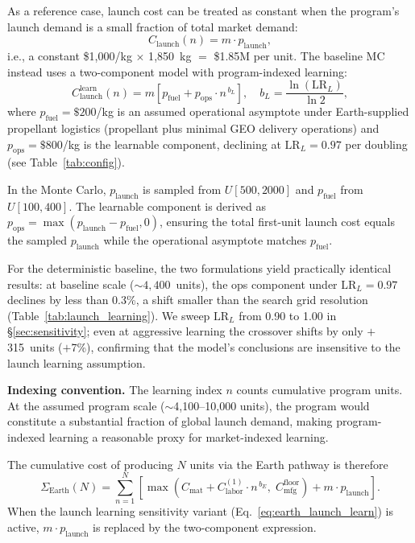 \documentclass[preprint,12pt]{elsarticle}
\begin{document}
As a reference case, launch cost can be treated as constant when the program's launch demand is a small fraction of total market demand:
\begin{equation}
  C_{\mathrm{launch}}(n) = m \cdot p_{\mathrm{launch}},
  \label{eq:earth_launch_baseline}
\end{equation}
i.e., a constant \$1{,}000/kg $\times$ 1{,}850~kg $=$ \$1.85M per unit. The baseline MC instead uses a two-component model with program-indexed learning:
\begin{equation}
  C_{\mathrm{launch}}^{\mathrm{learn}}(n) = m \left[ p_{\mathrm{fuel}} + p_{\mathrm{ops}} \cdot n^{\,b_L} \right], \quad b_L = \frac{\ln(\mathrm{LR}_L)}{\ln 2},
  \label{eq:earth_launch_learn}
\end{equation}
where $p_{\mathrm{fuel}} = \$200$/kg is an assumed operational asymptote under Earth-supplied propellant logistics (propellant plus minimal GEO delivery operations) and $p_{\mathrm{ops}} = \$800$/kg is the learnable component, declining at $\mathrm{LR}_L = 0.97$ per doubling (see Table~\ref{tab:config}).

In the Monte Carlo, $p_{\mathrm{launch}}$ is sampled from $U[500, 2000]$ and $p_{\mathrm{fuel}}$ from $U[100, 400]$. The learnable component is derived as $p_{\mathrm{ops}} = \max(p_{\mathrm{launch}} - p_{\mathrm{fuel}}, 0)$, ensuring the total first-unit launch cost equals the sampled $p_{\mathrm{launch}}$ while the operational asymptote matches $p_{\mathrm{fuel}}$.

For the deterministic baseline, the two formulations yield practically identical results: at baseline scale (${\sim}4{,}400$~units), the ops component under $\mathrm{LR}_L = 0.97$ declines by less than 0.3\%, a shift smaller than the search grid resolution (Table~\ref{tab:launch_learning}). We sweep $\mathrm{LR}_L$ from 0.90 to 1.00 in \S\ref{sec:sensitivity}; even at aggressive learning the crossover shifts by only $+$315~units ($+$7\%), confirming that the model's conclusions are insensitive to the launch learning assumption.

\textbf{Indexing convention.} The learning index $n$ counts cumulative program units. At the assumed program scale ($\sim$4{,}100--10{,}000 units), the program would constitute a substantial fraction of global launch demand, making program-indexed learning a reasonable proxy for market-indexed learning.

The cumulative cost of producing $N$ units via the Earth pathway is therefore
\begin{equation}
  \Sigma_{\mathrm{Earth}}(N) = \sum_{n=1}^{N} \left[ \max\!\left(C_{\mathrm{mat}} + C_{\mathrm{labor}}^{(1)} \cdot n^{\,b_E},\; C_{\mathrm{mfg}}^{\mathrm{floor}}\right) + m \cdot p_{\mathrm{launch}} \right].
  \label{eq:earth_cum}
\end{equation}
When the launch learning sensitivity variant (Eq.~\ref{eq:earth_launch_learn}) is active, $m \cdot p_{\mathrm{launch}}$ is replaced by the two-component expression.
\end{document}
